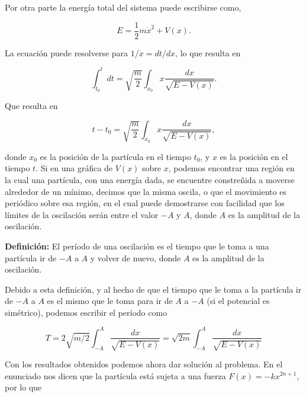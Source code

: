 \documentclass[a4paper,10pt]{article}
\numberwithin{equation}{section}
\newcommand{\definicion}{\textbf{Definición: }}
\begin{document}
Por otra parte la energía total del sistema puede escribirse como,

\begin{equation}
 E = \frac{1}{2} m\dot{x}^2 + V(x).
 \label{eq:energTotal1}
\end{equation}

La ecuación  puede resolverse para $1/\dot{x}=dt/dx$, lo que 
resulta en 

\begin{equation}
 \int_{t_0}^t dt = \sqrt{\frac{m}{2}} \int_{x_0}^{}x \frac{dx}{\sqrt{E - V(x)}}.
\end{equation}

Que resulta en 

\begin{equation}
  t - t_0 = \sqrt{\frac{m}{2}} \int_{x_0}^{}x \frac{dx}{\sqrt{E - V(x)}},
\end{equation}

donde $x_0$ es la posición de la partícula en el tiempo $t_0$, y $x$ es la posición 
en el tiempo $t$. Si en una gráfica de $V(x)$ sobre $x$, podemos encontrar una 
región en la cual una partícula, con una energía dada, se encuentre constreñida 
a moverse alrededor de un mínimo, decimos que la misma oscila, o que el movimiento 
es periódico sobre esa región, en el cual puede demostrarse con facilidad que 
los límites de la oscilación serán entre el valor $-A$ y $A$, donde $A$ es la amplitud 
de la oscilación.

\vspace{.3cm}

\definicion El período de una oscilación es el tiempo que le toma a una partícula 
ir de $-A$ a $A$ y volver de nuevo, donde $A$ es la amplitud de la oscilación.

\vspace{.3cm}

Debido a esta definición, y al hecho de que el tiempo que le toma a la partícula ir 
de $-A$ a $A$ es el mismo que le toma para ir de $A$ a $-A$ (si el potencial 
es simétrico), podemos escribir el período como

\begin{equation}
 T = 2 \sqrt{m/2} \int_{-A}^A \frac{dx}{\sqrt{E - V(x)}} = \sqrt{2m} \int_{-A}^A \frac{dx}{\sqrt{E - V(x)}}
\label{eq:periodo1}
\end{equation}


Con los resultados obtenidos podemos ahora dar solución al problema. En el 
enunciado nos dicen que la partícula está sujeta a una fuerza $F(x) = - kx^{2n+1}$,
por lo que 
\end{document}
